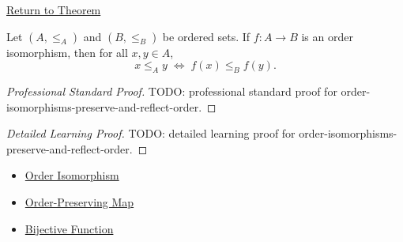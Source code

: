 \newpage
{}
\label{prf:order-isomorphisms-preserve-and-reflect-order}

\begin{remark*}[Return]
\hyperref[thm:order-isomorphisms-preserve-and-reflect-order]{Return to Theorem}
\end{remark*}

\begin{theorem*}
Let $(A,\leq_A)$ and $(B,\leq_B)$ be ordered sets. If $f:A\to B$ is an order
isomorphism, then for all $x,y\in A$,
\[
x\leq_A y \;\Longleftrightarrow\; f(x)\leq_B f(y).
\]
\end{theorem*}

\begin{proof}[Professional Standard Proof]
\LRAProofBodyStart
TODO: professional standard proof for order-isomorphisms-preserve-and-reflect-order.
\end{proof}

\begin{proof}[Detailed Learning Proof]
\LRAProofBodyStart
TODO: detailed learning proof for order-isomorphisms-preserve-and-reflect-order.
\end{proof}

\begin{remark*}
\end{remark*}

\begin{dependencies}
\begin{itemize}
  \item \hyperref[def:order-isomorphism-ordered-sets]{Order Isomorphism}
  \item \hyperref[def:order-preserving-map-ordered-sets]{Order-Preserving Map}
  \item \hyperref[def:bijective]{Bijective Function}
\end{itemize}
\end{dependencies}

\clearpage
